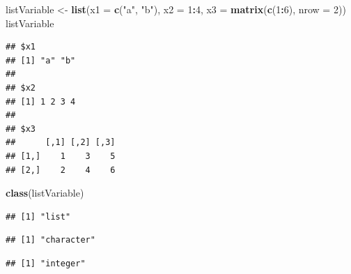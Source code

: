 \documentclass[]{book}
\newenvironment{Shaded}{\begin{snugshade}}{\end{snugshade}}
\newcommand{\KeywordTok}[1]{\textcolor[rgb]{0.13,0.29,0.53}{\textbf{#1}}}
\newcommand{\DataTypeTok}[1]{\textcolor[rgb]{0.13,0.29,0.53}{#1}}
\newcommand{\DecValTok}[1]{\textcolor[rgb]{0.00,0.00,0.81}{#1}}
\newcommand{\StringTok}[1]{\textcolor[rgb]{0.31,0.60,0.02}{#1}}
\newcommand{\OperatorTok}[1]{\textcolor[rgb]{0.81,0.36,0.00}{\textbf{#1}}}
\newcommand{\NormalTok}[1]{#1}
\theoremstyle{definition}
\theoremstyle{definition}
\theoremstyle{definition}
\theoremstyle{remark}
\begin{document}
\begin{Shaded}
\begin{Highlighting}[]
\NormalTok{listVariable <-}\StringTok{ }\KeywordTok{list}\NormalTok{(}\DataTypeTok{x1 =} \KeywordTok{c}\NormalTok{(}\StringTok{"a"}\NormalTok{, }\StringTok{"b"}\NormalTok{), }\DataTypeTok{x2 =} \DecValTok{1}\OperatorTok{:}\DecValTok{4}\NormalTok{, }\DataTypeTok{x3 =} \KeywordTok{matrix}\NormalTok{(}\KeywordTok{c}\NormalTok{(}\DecValTok{1}\OperatorTok{:}\DecValTok{6}\NormalTok{), }\DataTypeTok{nrow =} \DecValTok{2}\NormalTok{))}
\NormalTok{listVariable}
\end{Highlighting}
\end{Shaded}

\begin{verbatim}
## $x1
## [1] "a" "b"
## 
## $x2
## [1] 1 2 3 4
## 
## $x3
##      [,1] [,2] [,3]
## [1,]    1    3    5
## [2,]    2    4    6
\end{verbatim}

\begin{Shaded}
\begin{Highlighting}[]
\KeywordTok{class}\NormalTok{(listVariable)}
\end{Highlighting}
\end{Shaded}

\begin{verbatim}
## [1] "list"
\end{verbatim}

\begin{Shaded}
\end{Shaded}

\begin{verbatim}
## [1] "character"
\end{verbatim}

\begin{Shaded}
\end{Shaded}

\begin{verbatim}
## [1] "integer"
\end{verbatim}

\begin{Shaded}
\end{Shaded}
\end{document}
